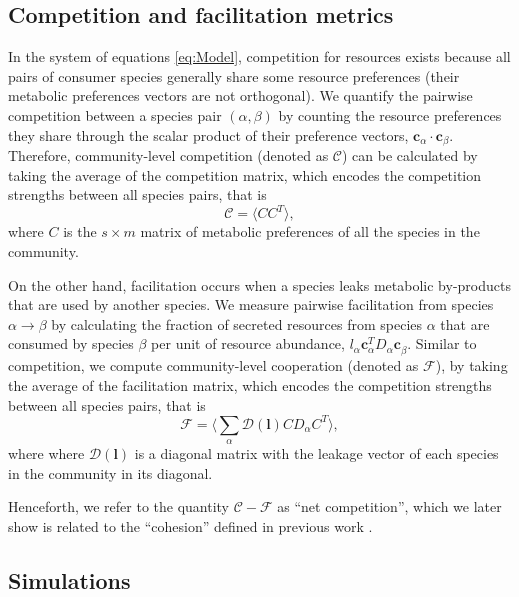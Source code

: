 \documentclass[10pt,letterpaper]{article}
\begin{document}
\subsection*{Competition and facilitation metrics}

In the system of equations \ref{eq:Model}, competition for resources exists because all pairs of consumer species generally share some resource preferences (their metabolic preferences vectors are not orthogonal). We quantify the pairwise competition between a species pair $(\alpha, \beta)$ by counting the resource preferences they share through the scalar product of their preference vectors, $\boldsymbol{c}_{\alpha}\cdot \boldsymbol{c}_{\beta}$. Therefore, community-level competition (denoted as $\mathcal{C}$) can be calculated by taking the average of the competition matrix, which encodes the competition strengths between all species pairs, that is
\begin{equation}\label{eq:competition}
    \mathcal{C} = \langle CC^T\rangle,
\end{equation}
where $C$ is the $s \times m$ matrix of metabolic preferences of all the species in the community. 

On the other hand, facilitation occurs when a species leaks metabolic by-products that are used by another species. We measure pairwise facilitation from species $\alpha \rightarrow \beta$ by calculating the fraction of secreted resources from species $\alpha$ that are consumed by species $\beta$ per unit of resource abundance, $l_{\alpha}\boldsymbol{c}_{\alpha}^TD_{\alpha}\boldsymbol{c}_{\beta}^{}$. Similar to competition, we compute community-level cooperation (denoted as $\mathcal{F}$), by taking the average of the facilitation matrix, which encodes the competition strengths between all species pairs, that is
\begin{equation}\label{eq:facilitation}
    \mathcal{F} = \langle \sum_{\alpha}\mathcal{D(\boldsymbol{l})} CD_{\alpha}C^T \rangle,
\end{equation}
where where $\mathcal{D}(\boldsymbol{l})$ is a diagonal matrix with the leakage vector of each species in the community in its diagonal.

Henceforth, we refer to the quantity  $\mathcal{C} - \mathcal{F}$ as ``net competition'', which we later show is related to the ``cohesion'' defined in previous work \cite{Tikhonov2016}.

\subsection*{Simulations}
\end{document}
